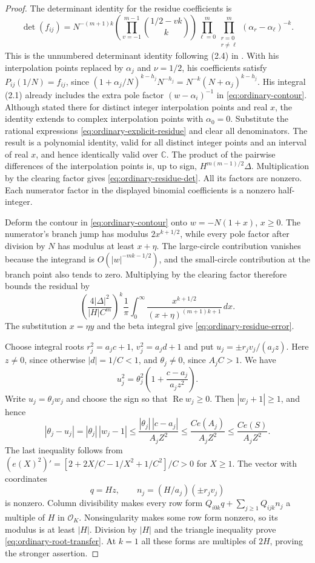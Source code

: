 \documentclass[12pt]{article}
\numberwithin{equation}{section}
\begin{document}
\begin{proof}
The determinant identity for the residue coefficients is
\[
 \det(f_{ij})=
 N^{-(m+1)k}
 \left(\prod_{v=-1}^{m-1}\binom{1/2-vk}{k}\right)
 \prod_{\ell=0}^m\prod_{\substack{r=0\\r\ne\ell}}^m
             (\alpha_r-\alpha_\ell)^{-k}.
\]
This is the unnumbered determinant identity following (2.4) in
\cite[\S2, p.~1721]{Bennett96}. With his interpolation points replaced by
$\alpha_j$ and $\nu=1/2$, his coefficients satisfy $P_{ij}(1/N)=f_{ij}$,
since $(1+\alpha_j/N)^{k-h_j}N^{-h_j}=N^{-k}(N+\alpha_j)^{k-h_j}$.
His integral (2.1) already includes the extra pole factor
$(w-\alpha_i)^{-1}$ in \eqref{eq:ordinary-contour}.
Although stated there for distinct integer interpolation points and real $x$,
the identity extends to complex interpolation points with $\alpha_0=0$. Substitute the rational expressions
\eqref{eq:ordinary-explicit-residue} and clear all denominators.  The
result is a polynomial identity, valid for all distinct integer points
and an interval of real $x$, and hence identically valid over
$\mathbb C$.  The product of the pairwise differences of the interpolation points is, up to sign, $H^{m(m-1)/2}\Delta$.  Multiplication by the clearing factor gives
\eqref{eq:ordinary-residue-det}.  All its factors are nonzero. Each
numerator factor in the displayed binomial coefficients is a nonzero
half-integer.

Deform the contour in \eqref{eq:ordinary-contour} onto
$w=-N(1+x)$, $x\ge0$.  The numerator's branch jump has modulus
$2x^{k+1/2}$, while every pole factor after division by $N$ has modulus at least
$x+\eta$.  The large-circle contribution vanishes because the
integrand is $O(|w|^{-mk-1/2})$, and the small-circle contribution at
the branch point also tends to zero.  Multiplying by the clearing
factor therefore bounds the residual by
\[
 \left(\frac{4|\Delta|^2}{|H|C^m}\right)^k\frac1\pi
 \int_0^\infty\frac{x^{k+1/2}}{(x+\eta)^{(m+1)k+1}}\,dx.
\]
The substitution $x=\eta y$ and the beta integral give
\eqref{eq:ordinary-residue-error}.

Choose integral roots $r_j^2=a_jc+1$, $v_j^2=a_jd+1$ and put
$u_j=\pm r_jv_j/(a_jz)$. Here $z\ne0$, since otherwise
$|d|=1/C<1$, and $\theta_j\ne0$, since $A_jC>1$. We have
\[
 u_j^2=\theta_j^2\left(1+\frac{c-a_j}{a_jz^2}\right).
\]
Write $u_j=\theta_jw_j$ and choose the sign so that
$\operatorname{Re}w_j\ge0$. Then $|w_j+1|\ge1$, and hence
\[
 |\theta_j-u_j|
 =|\theta_j|\,|w_j-1|
 \le\frac{|\theta_j|\,|c-a_j|}{A_jZ^2}
 \le\frac{Ce(A_j)}{A_jZ^2}
 \le\frac{Ce(S)}{A_jZ^2}.
\]
The last inequality follows from
$(e(X)^2)'=[2+2X/C-1/X^2+1/C^2]/C>0$ for $X\ge1$.
The vector with coordinates
\[
 q=Hz,\qquad n_j=(H/a_j)(\pm r_jv_j)
\]
is nonzero.  Column divisibility makes every row form
$Q_{i0k}q+\sum_{j\ge1}Q_{ijk}n_j$ a multiple of $H$ in
$\mathcal O_K$.  Nonsingularity makes some row form nonzero, so its
modulus is at least $|H|$.  Division by $|H|$ and the triangle
inequality prove \eqref{eq:ordinary-root-transfer}.  At $k=1$ all
these forms are multiples of $2H$, proving the stronger assertion.
\end{proof}
\end{document}
